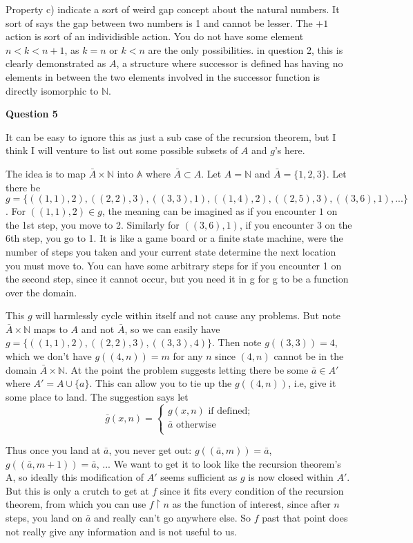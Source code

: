 \documentclass{article}
\begin{document}
\begin{enumerate}
\medskip
Property c) indicate a sort of weird gap concept about the natural numbers. It sort of says the gap between two numbers is 1 and cannot be lesser. The $+1$ action is sort of an individisible action. You do not have some element $n < k < n + 1$, as $k = n$ or $k < n$ are the only possibilities. in question 2, this is clearly demonstrated as $A$, a structure where successor is defined has having no elements in between the two elements involved in the successor function is directly isomorphic to $\mathbb{N}$.

\medskip
\textbf{Question 5}
\medskip

It can be easy to ignore this as just a sub case of the recursion theorem, but I think I will venture to list out some possible subsets of $A$ and $g$'s here.

\medskip

The idea is to map $\bar{A} \times \mathbb{N}$ into $\mathbb{A}$ where $\bar{A} \subset A$. Let $A = \mathbb{N}$ and $\bar{A} = \{1,2,3\}$. Let there be $g = \{((1,1),2),((2,2),3),((3,3),1),((1,4),2),((2,5),3),((3,6),1),...\}$. For $((1,1),2) \in g$, the meaning can be imagined as if you encounter $1$ on the 1st step, you move to 2. Similarly for $((3,6),1)$, if you encounter 3 on the 6th step, you go to 1. It is like a game board or a finite state machine, were the number of steps you taken and your current state determine the next location you must move to. You can have some arbitrary steps for if you encounter 1 on the second step, since it cannot occur, but you need it in g for g to be a function over the domain.

\medskip

This $g$ will harmlessly cycle within itself and not cause any problems. But note $\bar{A} \times \mathbb{N}$ maps to $A$ and not $\bar{A}$, so we can easily have $g = \{((1,1), 2), ((2,2), 3), ((3,3), 4)\}$. Then note $g((3,3)) = 4$, which we don't have $g((4,n)) = m$ for any $n$ since $(4,n)$ cannot be in the domain $\bar{A} \times \mathbb{N}$. At the point the problem suggests letting there be some $\bar{a} \in A'$ where $A' = A \cup \{a\}$. This can allow you to tie up the $g((4,n))$, i.e, give it some place to land. The suggestion says let 
\[
\bar{g}(x,n) = \begin{cases}
g(x,n) \text{ if defined;} \\
\bar{a} \text{ otherwise } \\
\end{cases}
\]

Thus once you land at $\bar{a}$, you never get out: $g((\bar{a},m)) = \bar{a}$, $g((\bar{a}, m + 1)) = \bar{a}$, ...
We want to get it to look like the recursion theorem's A, so ideally this modification of $A'$ seems sufficient as $g$ is now closed within $A'$. But this is only a crutch to get at $f$ since it fits every condition of the recursion theorem, from which you can use $f \upharpoonright n$ as the function of interest, since after $n$ steps, you land on $\bar{a}$ and really can't go anywhere else. So $f$ past that point does not really give any information and is not useful to us.



\end{enumerate}
\end{document}
